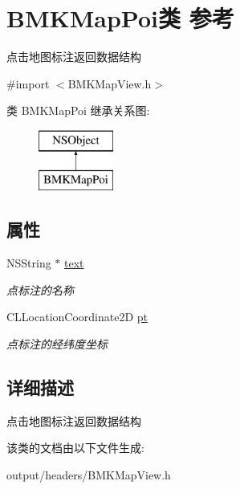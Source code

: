 \hypertarget{interface_b_m_k_map_poi}{}\section{B\+M\+K\+Map\+Poi类 参考}
\label{interface_b_m_k_map_poi}


点击地图标注返回数据结构  




{\ttfamily \#import $<$B\+M\+K\+Map\+View.\+h$>$}

类 B\+M\+K\+Map\+Poi 继承关系图\+:\begin{figure}[H]
\begin{center}
\leavevmode
\includegraphics[height=2.000000cm]{interface_b_m_k_map_poi}
\end{center}
\end{figure}
\subsection*{属性}
\begin{DoxyCompactItemize}
\item 
\hypertarget{interface_b_m_k_map_poi_a5d5c19bd352dcab43167d97aa47ea38d}{}N\+S\+String $\ast$ \hyperlink{interface_b_m_k_map_poi_a5d5c19bd352dcab43167d97aa47ea38d}{text}\label{interface_b_m_k_map_poi_a5d5c19bd352dcab43167d97aa47ea38d}

\begin{DoxyCompactList}\small\item\em 点标注的名称 \end{DoxyCompactList}\item 
\hypertarget{interface_b_m_k_map_poi_a771c0672bbe2dd1dc526003717bbcec1}{}C\+L\+Location\+Coordinate2\+D \hyperlink{interface_b_m_k_map_poi_a771c0672bbe2dd1dc526003717bbcec1}{pt}\label{interface_b_m_k_map_poi_a771c0672bbe2dd1dc526003717bbcec1}

\begin{DoxyCompactList}\small\item\em 点标注的经纬度坐标 \end{DoxyCompactList}\end{DoxyCompactItemize}


\subsection{详细描述}
点击地图标注返回数据结构 

该类的文档由以下文件生成\+:\begin{DoxyCompactItemize}
\item 
output/headers/B\+M\+K\+Map\+View.\+h\end{DoxyCompactItemize}
